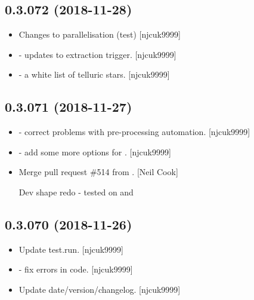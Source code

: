 \documentclass[a4paper,10pt,english]{report}
\begin{document}
\subsection{0.3.072 (2018-11-28)}
\label{\detokenize{misc/changelog:id250}}\begin{itemize}
\item {} 
Changes to parallelisation (test) {[}njcuk9999{]}

\item {} 
 - updates to extraction trigger. {[}njcuk9999{]}

\item {} 
 - a white list of telluric stars. {[}njcuk9999{]}

\end{itemize}


\subsection{0.3.071 (2018-11-27)}
\label{\detokenize{misc/changelog:id251}}\begin{itemize}
\item {} 
 - correct problems with pre-processing automation.
{[}njcuk9999{]}

\item {} 
 - add some more options for .
{[}njcuk9999{]}

\item {} 
Merge pull request \#514 from . {[}Neil Cook{]}

Dev shape redo - tested on  and 

\end{itemize}


\subsection{0.3.070 (2018-11-26)}
\label{\detokenize{misc/changelog:id252}}\begin{itemize}
\item {} 
Update test.run. {[}njcuk9999{]}

\item {} 
 - fix errors in code. {[}njcuk9999{]}

\item {} 
Update date/version/changelog. {[}njcuk9999{]}

\end{itemize}
\end{document}
